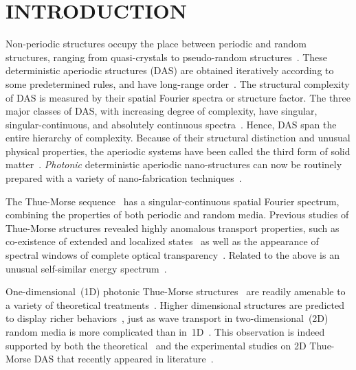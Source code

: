 
\section{INTRODUCTION}
\label{sec:introduction_TB}

Non-periodic structures occupy the place between periodic and random structures, ranging from quasi-crystals to pseudo-random structures~\cite{2006_Macia}. These deterministic aperiodic structures (DAS) are obtained iteratively according to some predetermined rules, and have long-range order~\cite{2009_Barber}. The structural complexity of DAS is measured by their spatial Fourier spectra or structure factor. The three major classes of DAS, with increasing degree of complexity, have singular, singular-continuous, and absolutely continuous spectra~\cite{2006_Macia}. Hence, DAS span the entire hierarchy of complexity. Because of their structural distinction and unusual physical properties, the aperiodic systems have been called the third form of solid matter~\cite{2010_Ivchenko}. {\it Photonic} deterministic aperiodic nano-structures can now be routinely prepared with a variety of nano-fabrication techniques~\cite{2011_Dal_Negro_DAS_review}.

The Thue-Morse sequence~\cite{1921_Morse} has a singular-continuous spatial Fourier spectrum, combining the properties of both periodic and random media. Previous studies of Thue-Morse structures revealed highly anomalous transport properties, such as co-existence of extended and localized states~\cite{1992_Ryu} as well as the appearance of spectral windows of complete optical transparency~\cite{2004_Peng}. Related to the above is an unusual self-similar energy spectrum~\cite{1988_Cheng_Thue_Morse,1989_Luck}. 

One-dimensional~(1D) photonic Thue-Morse structures~\cite{1997_Liu,2004_Negro,2004_Qiu,2005_Agarwal,2005_Joannopoulos,2007_Agarwal} are readily amenable to a variety of theoretical treatments~\cite{2009_Barber,2010_Ivchenko}. Higher dimensional structures are predicted to display richer behaviors~\cite{2011_Dal_Negro_DAS_review}, just as wave transport in two-dimensional~(2D) random media is more complicated than in~1D~\cite{1979_Anderson}. This observation is indeed supported by both the theoretical~\cite{2007_Moretti,2008_Boriskina} and the experimental studies on 2D Thue-Morse DAS that recently appeared in literature~\cite{2004_Negro,2007_Agarwal,2008_Negro,2009_Boriskina,2007_Matsui,2008_Gopinath_DAS,2011_Cao_DAS}. 

